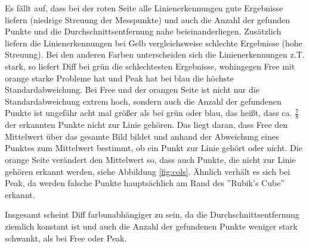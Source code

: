 \documentclass[ngerman,a4paper,parskip=half]{scrartcl}
\begin{document}
Es fällt auf, dass bei der roten Seite alle Linienerkennungen gute Ergebnisse liefern (niedrige Streuung der Messpunkte) und auch die Anzahl der gefunden Punkte und die Durchschnittsentfernung nahe beieinanderliegen. Zusätzlich liefern die Linienerkennungen bei Gelb vergleichsweise schlechte Ergebnisse (hohe Streuung). Bei den anderen Farben unterscheiden sich die Linienerkennungen z.T. stark, so liefert Diff bei grün die schlechtesten Ergebnisse, wohingegen Free mit orange starke Probleme hat und Peak hat bei blau die höchste Standardabweichung. Bei Free und der orangen Seite ist nicht nur die Standardabweichung extrem hoch, sondern auch die Anzahl der gefundenen Punkte ist ungefähr acht mal größer als bei grün oder blau, das heißt, dass ca. $\frac{7}{8}$ der erkannten Punkte nicht zur Linie gehören. Das liegt daran, dass Free den Mittelwert über das gesamte Bild bildet und anhand der Abweichung eines Punktes zum Mittelwert bestimmt, ob ein Punkt zur Linie gehört oder nicht. Die orange Seite verändert den Mittelwert so, dass auch Punkte, die nicht zur Linie gehören erkannt werden, siehe Abbildung \ref{fig:cols}. Ähnlich verhält es sich bei Peak, da werden falsche Punkte hauptsächlich am Rand des ''Rubik's Cube'' erkannt.

Insgesamt scheint Diff farbunabhängiger zu sein, da die Durchschnittsentfernung ziemlich konstant ist und auch die Anzahl der gefundenen Punkte weniger stark schwankt, als bei Free oder Peak. 
\end{document}
